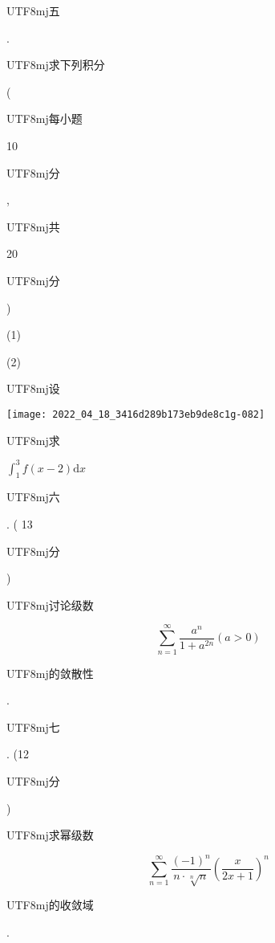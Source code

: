 \documentclass[10pt]{article}
\begin{document}
\begin{CJK}{UTF8}{mj}五\end{CJK}. \begin{CJK}{UTF8}{mj}求下列积分\end{CJK} (\begin{CJK}{UTF8}{mj}每小题\end{CJK} 10 \begin{CJK}{UTF8}{mj}分\end{CJK}, \begin{CJK}{UTF8}{mj}共\end{CJK} 20 \begin{CJK}{UTF8}{mj}分\end{CJK})

(1)

(2) \begin{CJK}{UTF8}{mj}设\end{CJK}

\texttt{[image: 2022\_04\_18\_3416d289b173eb9de8c1g-082]}

\begin{CJK}{UTF8}{mj}求\end{CJK} $\int_{1}^{3} f(x-2) \mathrm{d} x$

\begin{CJK}{UTF8}{mj}六\end{CJK}. ( 13 \begin{CJK}{UTF8}{mj}分\end{CJK}) \begin{CJK}{UTF8}{mj}讨论级数\end{CJK}
$$
\sum_{n=1}^{\infty} \frac{a^{n}}{1+a^{2 n}}(a>0)
$$
\begin{CJK}{UTF8}{mj}的敛散性\end{CJK}.

\begin{CJK}{UTF8}{mj}七\end{CJK}. (12 \begin{CJK}{UTF8}{mj}分\end{CJK}) \begin{CJK}{UTF8}{mj}求幂级数\end{CJK}
$$
\sum_{n=1}^{\infty} \frac{(-1)^{n}}{n \cdot \sqrt[n]{n}}\left(\frac{x}{2 x+1}\right)^{n}
$$
\begin{CJK}{UTF8}{mj}的收敛域\end{CJK}.
\end{document}
